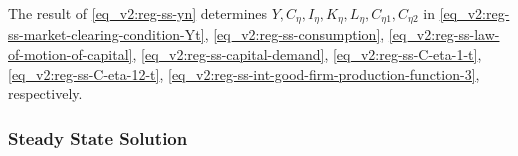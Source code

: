 \documentclass[../thesis.tex]{subfiles}
\begin{document}
\begin{comment}
Substitute \ref{eq_v2:reg-ss-C21} in \ref{eq_v2:reg-ss-C22}:
\begin{align}
	C_{22} &= C_{21} \left( \frac{1 - \omega_{21}}{\omega_{21} \theta_{P}} \right) = C_{2} \left( \frac{\omega_{21} \theta_{P}}{1 - \omega_{21}} \right)^{1 - \omega_{21}} \left( \frac{1 - \omega_{21}}{\omega_{21} \theta_{P}} \right) \tag{\ref{eq_v2:reg-ss-C22}} \implies \\
	C_{22} &= C_{2} b_{2}^{\omega_{21}} \label{eq_v2:reg-ss-C22-b}
\end{align}
	
\end{comment}








	The result of \ref{eq_v2:reg-ss-yn} determines $Y, C_{\eta}, I_{\eta}, K_{\eta}, L_{\eta}, C_{\eta 1}, C_{\eta 2}$ in 
	\ref{eq_v2:reg-ss-market-clearing-condition-Yt}, 
	\ref{eq_v2:reg-ss-consumption}, 
	\ref{eq_v2:reg-ss-law-of-motion-of-capital},
	\ref{eq_v2:reg-ss-capital-demand},
	\ref{eq_v2:reg-ss-C-eta-1-t}, 
	\ref{eq_v2:reg-ss-C-eta-12-t}, 
	\ref{eq_v2:reg-ss-int-good-firm-production-function-3}, respectively.
	

	
	
	\subsubsection{Steady State Solution}
	
	\vspace*{-1cm}
\end{document}
